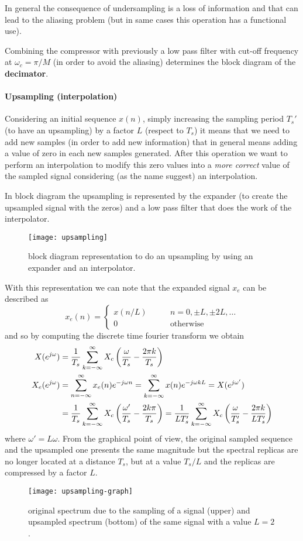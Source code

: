 	In general the consequence of undersampling is a loss of information and that can lead to the aliasing problem (but in same cases this operation has a functional use).
		
	Combining the compressor with previously a low pass filter with cut-off frequency at $\omega_c = \pi/M$ (in order to avoid the aliasing) determines the block diagram of the \textbf{decimator}.	
	
	\paragraph{Upsampling (interpolation)} Considering an initial sequence $x(n)$, simply increasing the sampling period $T_s'$ (to have an upsampling) by a factor $L$ (respect to $T_s$) it means that we need to add new samples (in order to add new information) that in general means adding a value of zero in each new samples generated. After this operation we want to perform an interpolation to modify this zero values into a \textit{more correct} value of the sampled signal considering (as the name suggest) an interpolation.
		
	In block diagram the upsampling is represented by the expander (to create the upsampled signal with the zeros) and a low pass filter that does the work of the interpolator.
		\begin{SCfigure}[2][bht]
			\centering \texttt{[image: upsampling]}
			\caption{block diagram representation to do an upsampling by using an expander and an interpolator.}
		\end{SCfigure}
	
	With this representation we can note that the expanded signal $x_e$ can be described as
	\[ x_e(n) = \begin{cases}
		x(n/L) \qquad &n = 0,\pm L,\pm 2L,\dots \\ 0 & \textrm{otherwise}
	\end{cases} \]
	and so by computing the discrete time fourier transform we obtain
	\begin{align*}
		X(e^{j\omega}) &= \frac 1 {T_s} \sum_{k=-\infty}^\infty X_c\left(\frac \omega {T_s} - \frac{2\pi k}{T_s}\right) \\
		X_e(e^{j\omega}) &= \sum_{n=-\infty}^\infty x_e(n) e^{-j\omega n} = \sum_{k=-\infty}^\infty x(n) e^{-j\omega k L} = X(e^{j\omega '}) \\
		& = \frac 1 {T_s} \sum_{k=-\infty}^\infty X_c \left( \frac{\omega'}{T_s} - \frac{2k\pi}{T_s} \right) = \frac 1 {LT_s'} \sum_{k=-\infty}^\infty X_c \left( \frac{\omega}{T_s'} - \frac{2\pi k}{LT_s'} \right)
	\end{align*}
	where $\omega' = L \omega$. From the graphical point of view, the original sampled sequence and the upsampled one presents the same magnitude but the spectral replicas are no longer located at a distance $T_s$, but at a value $T_s/L$ and the replicas are compressed by a factor $L$.
		\begin{SCfigure}[2][bht]
			\centering \texttt{[image: upsampling-graph]}
			\caption{original spectrum due to the sampling of a signal (upper) and upsampled spectrum (bottom) of the same signal with a value $L=2$.}
			\label{fig:conv:upsampling}
		\end{SCfigure}
	

